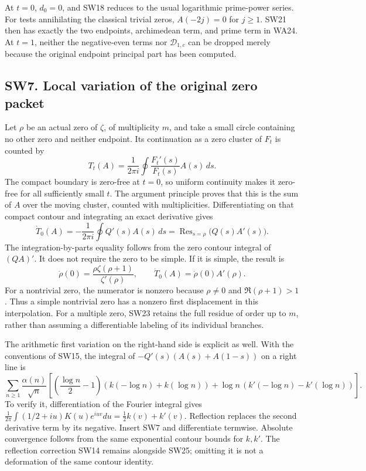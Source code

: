 \documentclass[
  10pt,
  a4paper,
]{article}
\begin{document}
At \(t=0\), \(d_0=0\), and SW18 reduces to the usual logarithmic
prime-power series. For tests annihilating the classical trivial zeros,
\(A(-2j)=0\) for \(j\ge1\). SW21 then has exactly the two endpoints,
archimedean term, and prime term in WA24. At \(t=1\), neither the
negative-even terms nor \(\mathcal D_{1,c}\) can be dropped merely
because the original endpoint principal part has been computed.

\subsection{SW7. Local variation of the original zero
packet}\label{sw7.-local-variation-of-the-original-zero-packet}

Let \(\rho\) be an actual zero of \(\zeta\), of multiplicity \(m\), and
take a small circle containing no other zero and neither endpoint. Its
continuation as a zero cluster of \(F_t\) is counted by \[
T_t(A)=\frac1{2\pi i}\oint \frac{F_t'(s)}{F_t(s)}A(s)\,ds.
\tag{SW22}
\] The compact boundary is zero-free at \(t=0\), so uniform continuity
makes it zero-free for all sufficiently small \(t\). The argument
principle proves that this is the sum of \(A\) over the moving cluster,
counted with multiplicities. Differentiating on that compact contour and
integrating an exact derivative gives \[
\dot T_0(A)=-\frac1{2\pi i}\oint Q'(s)A(s)\,ds
=\operatorname {Res}_{s=\rho}\bigl(Q(s)A'(s)\bigr).
\tag{SW23}
\] The integration-by-parts equality follows from the zero contour
integral of \((QA)'\). It does not require the zero to be simple. If it
is simple, the result is \[
\dot\rho(0)=\frac{\rho\zeta(\rho+1)}{\zeta'(\rho)},\qquad
\dot T_0(A)=\dot\rho(0)A'(\rho).
\tag{SW24}
\] For a nontrivial zero, the numerator is nonzero because \(\rho\ne0\)
and \(\Re(\rho+1)>1\). Thus a simple nontrivial zero has a nonzero first
displacement in this interpolation. For a multiple zero, SW23 retains
the full residue of order up to \(m\), rather than assuming a
differentiable labeling of its individual branches.

The arithmetic first variation on the right-hand side is explicit as
well. With the conventions of SW15, the integral of
\(-Q'(s)(A(s)+A(1-s))\) on a right line is \[
\sum_{n\ge1}\frac{\alpha(n)}{\sqrt n}
\left[
\left(\frac{\log n}2-1\right)(k(-\log n)+k(\log n))
+\log n\,(k'(-\log n)-k'(\log n))
\right].
\tag{SW25}
\] To verify it, differentiation of the Fourier integral gives
\(\frac1{2\pi}\int(1/2+iu)K(u)e^{iuv}du=\tfrac12 k(v)+k'(v)\).
Reflection replaces the second derivative term by its negative. Insert
SW7 and differentiate termwise. Absolute convergence follows from the
same exponential contour bounds for \(k,k'\). The reflection correction
SW14 remains alongside SW25; omitting it is not a deformation of the
same contour identity.
\end{document}
